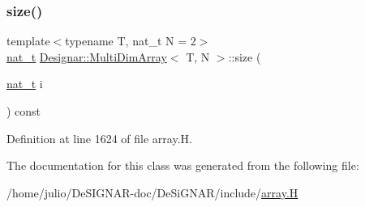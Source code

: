 \subsubsection{\texorpdfstring{size()}{size()}}
{\footnotesize\ttfamily template$<$typename T, nat\+\_\+t N = 2$>$ \\
\hyperlink{namespace_designar_aa72662848b9f4815e7bf31a7cf3e33d1}{nat\+\_\+t} \hyperlink{class_designar_1_1_multi_dim_array}{Designar\+::\+Multi\+Dim\+Array}$<$ T, N $>$\+::size (\begin{DoxyParamCaption}\item[{\hyperlink{namespace_designar_aa72662848b9f4815e7bf31a7cf3e33d1}{nat\+\_\+t}}]{i }\end{DoxyParamCaption}) const\hspace{0.3cm}{\ttfamily [inline]}}



Definition at line 1624 of file array.\+H.



The documentation for this class was generated from the following file\+:\begin{DoxyCompactItemize}
\item 
/home/julio/\+De\+S\+I\+G\+N\+A\+R-\/doc/\+De\+Si\+G\+N\+A\+R/include/\hyperlink{array_8_h}{array.\+H}\end{DoxyCompactItemize}
